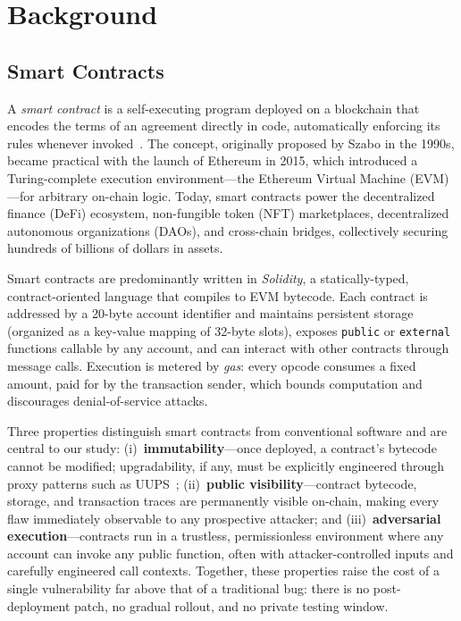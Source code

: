 \section{Background}
\label{sec:background}

\subsection{Smart Contracts}

A \emph{smart contract} is a self-executing program deployed on a blockchain that encodes the terms of an agreement directly in code, automatically enforcing its rules whenever invoked~\cite{wood2014ethereum, buterin2014next}. The concept, originally proposed by Szabo in the 1990s, became practical with the launch of Ethereum in 2015, which introduced a Turing-complete execution environment---the Ethereum Virtual Machine (EVM)---for arbitrary on-chain logic. Today, smart contracts power the decentralized finance (DeFi) ecosystem, non-fungible token (NFT) marketplaces, decentralized autonomous organizations (DAOs), and cross-chain bridges, collectively securing hundreds of billions of dollars in assets.

Smart contracts are predominantly written in \emph{Solidity}, a statically-typed, contract-oriented language that compiles to EVM bytecode. Each contract is addressed by a 20-byte account identifier and maintains persistent storage (organized as a key-value mapping of 32-byte slots), exposes \texttt{public} or \texttt{external} functions callable by any account, and can interact with other contracts through message calls. Execution is metered by \emph{gas}: every opcode consumes a fixed amount, paid for by the transaction sender, which bounds computation and discourages denial-of-service attacks.

Three properties distinguish smart contracts from conventional software and are central to our study: (i)~\textbf{immutability}---once deployed, a contract's bytecode cannot be modified; upgradability, if any, must be explicitly engineered through proxy patterns such as UUPS~\cite{chen2020defining}; (ii)~\textbf{public visibility}---contract bytecode, storage, and transaction traces are permanently visible on-chain, making every flaw immediately observable to any prospective attacker; and (iii)~\textbf{adversarial execution}---contracts run in a trustless, permissionless environment where any account can invoke any public function, often with attacker-controlled inputs and carefully engineered call contexts. Together, these properties raise the cost of a single vulnerability far above that of a traditional bug: there is no post-deployment patch, no gradual rollout, and no private testing window.

